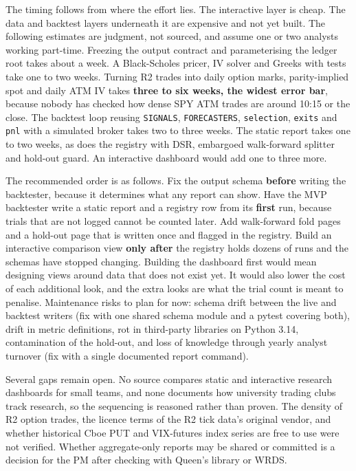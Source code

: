 \documentclass{article}
\begin{document}
The timing follows from where the effort lies. The interactive layer is cheap. The data and backtest layers underneath it are expensive and not yet built. The following estimates are judgment, not sourced, and assume one or two analysts working part-time. Freezing the output contract and parameterising the ledger root takes about a week. A Black-Scholes pricer, IV solver and Greeks with tests take one to two weeks. Turning R2 trades into daily option marks, parity-implied spot and daily ATM IV takes \textbf{three to six weeks, the widest error bar}, because nobody has checked how dense SPY ATM trades are around 10:15 or the close. The backtest loop reusing \texttt{SIGNALS}, \texttt{FORECASTERS}, \texttt{selection}, \texttt{exits} and \texttt{pnl} with a simulated broker takes two to three weeks. The static report takes one to two weeks, as does the registry with DSR, embargoed walk-forward splitter and hold-out guard. An interactive dashboard would add one to three more.

The recommended order is as follows. Fix the output schema \textbf{before} writing the backtester, because it determines what any report can show. Have the MVP backtester write a static report and a registry row from its \textbf{first} run, because trials that are not logged cannot be counted later. Add walk-forward fold pages and a hold-out page that is written once and flagged in the registry. Build an interactive comparison view \textbf{only after} the registry holds dozens of runs and the schemas have stopped changing. Building the dashboard first would mean designing views around data that does not exist yet. It would also lower the cost of each additional look, and the extra looks are what the trial count is meant to penalise. Maintenance risks to plan for now: schema drift between the live and backtest writers (fix with one shared schema module and a pytest covering both), drift in metric definitions, rot in third-party libraries on Python 3.14, contamination of the hold-out, and loss of knowledge through yearly analyst turnover (fix with a single documented report command).

Several gaps remain open. No source compares static and interactive research dashboards for small teams, and none documents how university trading clubs track research, so the sequencing is reasoned rather than proven. The density of R2 option trades, the licence terms of the R2 tick data's original vendor, and whether historical Cboe PUT and VIX-futures index series are free to use were not verified. Whether aggregate-only reports may be shared or committed is a decision for the PM after checking with Queen's library or WRDS.
\end{document}
